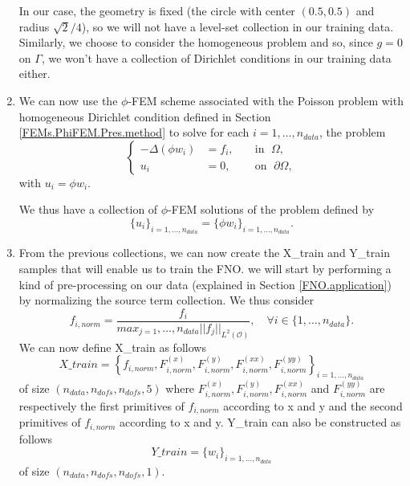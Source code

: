 \begin{enumerate}[label=\textbullet]
	In our case, the geometry is fixed (the circle with center $(0.5,0.5)$ and radius $\sqrt{2}/4$), so we will not have a level-set collection in our training data. Similarly, we choose to consider the homogeneous problem and so, since $g=0$ on $\Gamma$, we won't have a collection of Dirichlet conditions in our training data either.
	
	\item We can now use the $\phi$-FEM scheme associated with the Poisson problem with homogeneous Dirichlet condition defined in Section \ref{FEMs.PhiFEM.Pres.method} to solve for each $i=1,\dots,n_{data}$, the problem
	\begin{equation*}
		\left\{
		\begin{aligned}
			-\Delta (\phi w_i) &= f_i, \; &&\text{in } \; \Omega, \\
			u_i&=0, \; &&\text{on } \; \partial\Omega,
		\end{aligned}
		\right.
	\end{equation*}
	with $u_i=\phi w_i$.
	
	We thus have a collection of $\phi$-FEM solutions of the problem defined by
	\begin{equation*}
		\{u_i\}_{i=1,\dots,n_{data}}=\{\phi w_i\}_{i=1,\dots,n_{data}}.
	\end{equation*}
	
	\item From the previous collections, we can now create the X\_train and Y\_train samples that will enable us to train the FNO. we will start by performing a kind of pre-processing on our data (explained in Section \ref{FNO.application}) by normalizing the source term collection. We thus consider
	\begin{equation*}
		f_{i,norm} = \frac{f_i}{max_{j=1},\dots,n_{data} ||f_j||_{L^2(\mathcal{O})}}, \quad \forall i\in \{1,\dots,n_{data}\}.
	\end{equation*}
	We can now define X\_train as follows
	\begin{equation*}
		X\_train =  \left\{f_{i,norm},F_{i,norm}^{(x)},F_{i,norm}^{(y)},F_{i,norm}^{(xx)},F_{i,norm}^{(yy)}\right\}_{i=1,\dots,n_{data}}
	\end{equation*}
	of size $(n_{data},n_{dofs},n_{dofs},5)$ where $F_{i,norm}^{(x)},F_{i,norm}^{(y)},F_{i,norm}^{(xx)}$ and $F_{i,norm}^{(yy)}$ are respectively the first primitives of $f_{i,norm}$ according to x and y and the second primitives of $f_{i,norm}$ according to x and y.
	Y\_train can also be constructed as follows
	\begin{equation*}
		Y\_train = \{w_i\}_{i=1,\dots,n_{data}}
	\end{equation*}
	of size $(n_{data},n_{dofs},n_{dofs},1)$.
	

\end{enumerate}

